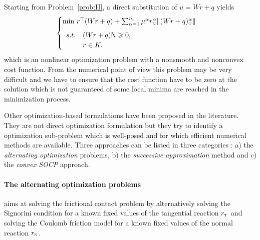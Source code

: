 Starting from Problem~\ref{prob:II}, a direct substitution of $u = Wr +q$ yields
\begin{equation}
  \label{eq:opt-3}
  \begin{cases}
    \min\, r^\top (Wr+q) + \sum _{\alpha=1}^{n_c} \mu^\alpha r_\n^\alpha \|(Wr+q)_\t^\alpha\| \\[2mm]
    \begin{array}{ll}
      s.t. &(W r + q){\sf N} \geq 0, \\
      &r \in K.
    \end{array}
  \end{cases}
\end{equation}
which is an nonlinear optimization problem with a nonsmooth and nonconvex cost function.  From the numerical point of view this problem may be very difficult and we have to ensure that the cost function have to be zero at the solution which is not guaranteed of some local minima are reached in the minimization process.

Other optimization-based formulations have been proposed in the literature. They are not direct optimization formulation but they try to identify a optimization sub-problem which is well-posed and for which efficient numerical methods are available. Three approaches can be listed in three categories : a)  the \textit{alternating optimization} problems, b) the \textit{successive approximation} method and c)  the \textit{convex SOCP} approach.


\paragraph{The alternating optimization problems} aims at solving the frictional contact problem by alternatively solving the Signorini condition for a known fixed values of the tangential reaction $r_{\hbox{\tiny{T}}}$ and solving the Coulomb friction model for a known fixed values of the normal reaction $r_{\hbox{\tiny{N}}}$. 

